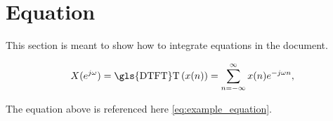 \newpage
\section{Equation}\label{sec:equation}
This section is meant to show how to integrate equations in the document.

\begin{equation}\label{eq:example_equation}
	X(e^{j\omega})=\text{\gls{DTFT}T}\left(x(n)\right)=\sum_{n=-\infty}^{\infty}x(n)e^{-j\omega n},
\end{equation}

\noindent The equation above is referenced here \cref{eq:example_equation}.

